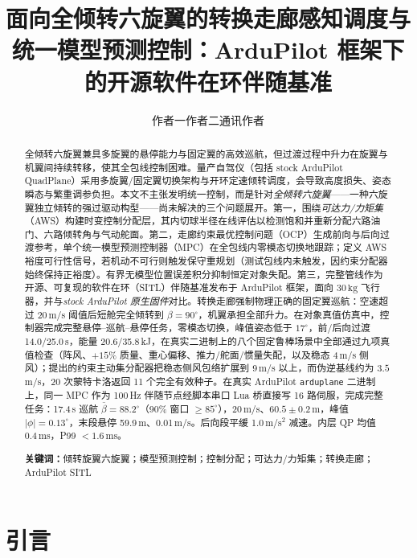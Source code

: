 \documentclass[UTF8,a4paper,11pt]{ctexart}
\newcommand{\SI}[2]{\ensuremath{#1\,#2}}
\newcommand{\kilogram}{\mathrm{kg}}
\begin{document}
\title{面向全倾转六旋翼的转换走廊感知调度与统一模型预测控制：ArduPilot 框架下的开源软件在环伴随基准}
\author{作者一\quad 作者二\quad 通讯作者}
\date{}
\maketitle

\begin{abstract}
全倾转六旋翼兼具多旋翼的悬停能力与固定翼的高效巡航，但过渡过程中升力在旋翼与机翼间持续转移，使其全包线控制困难。量产自驾仪（包括 stock ArduPilot QuadPlane）采用多旋翼/固定翼切换架构与开环定速倾转调度，会导致高度损失、姿态瞬态与繁重调参负担。本文不主张发明统一控制，而是针对\emph{全倾转六旋翼}——一种六旋翼独立倾转的强过驱动构型——尚未解决的三个问题展开。第一，围绕\emph{可达力/力矩集}（AWS）构建时变控制分配层，其内切球半径在线评估以检测饱和并重新分配六路油门、六路倾转角与气动舵面。第二，走廊约束最优控制问题（OCP）生成前向与后向过渡参考，单个统一模型预测控制器（MPC）在全包线内零模态切换地跟踪；定义 AWS 裕度可行性信号，若机动不可行则触发保守重规划（测试包线内未触发，因约束分配器始终保持正裕度）。有界无模型位置误差积分抑制恒定对象失配。第三，完整管线作为开源、可复现的软件在环（SITL）伴随基准发布于 ArduPilot 框架，面向 \SI{30}{\kilogram} 飞行器，并与\emph{stock ArduPilot 原生固件}对比。转换走廊强制物理正确的固定翼巡航：空速超过 $20$\,m/s 阈值后短舱完全倾转到 $\beta=90^\circ$，机翼承担全部升力。在对象真值仿真中，控制器完成完整悬停--巡航--悬停任务，零模态切换，峰值姿态低于 $17^\circ$，前/后向过渡 14.0/25.0\,s，能量 20.6/35.8\,kJ，在真实二进制上的八个固定鲁棒场景中全部通过九项真值检查（阵风、$+15\%$ 质量、重心偏移、推力/舵面/惯量失配，以及稳态 4\,m/s 侧风）；提出的约束主动集分配器把稳态侧风包络扩展到 9\,m/s 以上，而伪逆基线约为 $3.5$\,m/s，20 次蒙特卡洛返回 11 个完全有效种子。在真实 ArduPilot \texttt{arduplane} 二进制上，同一 MPC 作为 100\,Hz 伴随节点经脚本串口 Lua 桥直接写 16 路伺服，完成完整任务：17.4\,s 巡航 $\bar\beta=88.2^\circ$（90\% 窗口 $\ge85^\circ$），20\,m/s、$60.5\pm0.2$\,m，峰值 $|\phi|=0.13^\circ$，末段悬停 59.9\,m、0.01\,m/s。后向段平缓 1.0\,m/s$^2$ 减速。内层 QP 均值 0.4\,ms，P99 $<1.6$\,ms。

\textbf{关键词：}倾转旋翼六旋翼；模型预测控制；控制分配；可达力/力矩集；转换走廊；ArduPilot SITL
\end{abstract}

\tableofcontents

\section{引言}\label{sec:intro}
\end{document}
